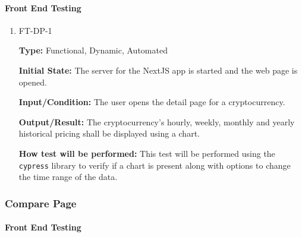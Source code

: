 \documentclass[12pt, titlepage]{article}
\begin{document}
\paragraph{Front End Testing}

\begin{enumerate}

\item{FT-DP-1}

\textbf{Type:} Functional, Dynamic, Automated
					
\textbf{Initial State:} The server for the NextJS app is started and the web page is opened.
					
\textbf{Input/Condition:} The user opens the detail page for a cryptocurrency.
					
\textbf{Output/Result:} The cryptocurrency's hourly, weekly, monthly and yearly historical pricing shall be displayed using a chart.
					
\textbf{How test will be performed:} This test will be performed using the \texttt{cypress} library to verify if a chart is present along with options to change the time range of the data.

\end{enumerate}

\subsubsection{Compare Page}
		
\paragraph{Front End Testing}
\end{document}

